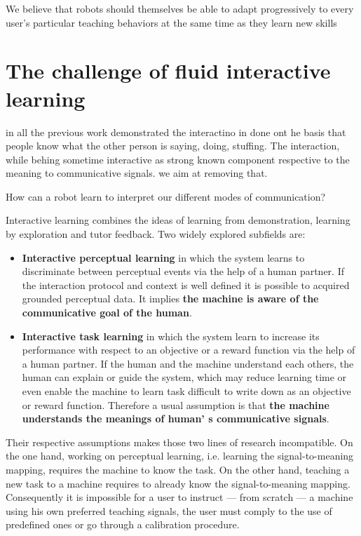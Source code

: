  We believe that robots should themselves be
able to adapt progressively to every user's particular teaching
behaviors at the same time as they learn new skills

\section{The challenge of fluid interactive learning}


in all the previous work demonstrated the interactino in done ont he basis that people know what the other person is saying, doing, stuffing. The interaction, while behing sometime interactive as strong known component respective to the meaning to communicative signals. we aim at removing that.


How can a robot learn to interpret our different modes of communication? 

Interactive learning combines the ideas of learning from demonstration, learning by exploration and tutor feedback. Two widely explored subfields are:
\begin{itemize}
\item \textbf{Interactive perceptual learning} in which the system learns to discriminate between perceptual events via the help of a human partner. If the interaction protocol and context is well defined it is possible to acquired grounded perceptual data. It implies \textbf{the machine is aware of the communicative goal of the human}.
\item \textbf{Interactive task learning} in which the system learn to increase its performance with respect to an objective or a reward function via the help of a human partner. If the human and the machine understand each others, the human can explain or guide the system, which may reduce learning time or even enable the machine to learn task difficult to write down as an objective or reward function. Therefore a usual assumption is that \textbf{the machine understands the meanings of human' s  communicative signals}.
\end{itemize}

Their respective assumptions makes those two lines of research incompatible. On the one hand, working on perceptual learning, i.e. learning the signal-to-meaning mapping, requires the machine to know the task. On the other hand, teaching a new task to a machine requires to already know the signal-to-meaning mapping. Consequently it is impossible for a user to instruct --- from scratch --- a machine using his own preferred teaching signals, the user must comply to the use of predefined ones or go through a calibration procedure.

